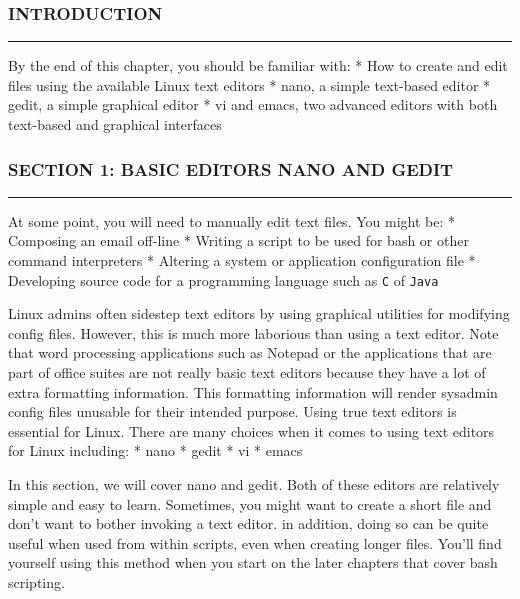 \subsubsection{INTRODUCTION}\label{introduction-9}

\begin{center}\rule{3in}{0.4pt}\end{center}

By the end of this chapter, you should be familiar with: * How to create
and edit files using the available Linux text editors * nano, a simple
text-based editor * gedit, a simple graphical editor * vi and emacs, two
advanced editors with both text-based and graphical interfaces

\subsubsection{SECTION 1: BASIC EDITORS NANO AND
GEDIT}\label{section-1-basic-editors-nano-and-gedit}

\begin{center}\rule{3in}{0.4pt}\end{center}

At some point, you will need to manually edit text files. You might be:
* Composing an email off-line * Writing a script to be used for bash or
other command interpreters * Altering a system or application
configuration file * Developing source code for a programming language
such as \texttt{C} of \texttt{Java}

Linux admins often sidestep text editors by using graphical utilities
for modifying config files. However, this is much more laborious than
using a text editor. Note that word processing applications such as
Notepad or the applications that are part of office suites are not
really basic text editors because they have a lot of extra formatting
information. This formatting information will render sysadmin config
files unusable for their intended purpose. Using true text editors is
essential for Linux. There are many choices when it comes to using text
editors for Linux including: * nano * gedit * vi * emacs

In this section, we will cover nano and gedit. Both of these editors are
relatively simple and easy to learn. Sometimes, you might want to create
a short file and don't want to bother invoking a text editor. in
addition, doing so can be quite useful when used from within scripts,
even when creating longer files. You'll find yourself using this method
when you start on the later chapters that cover bash scripting.

